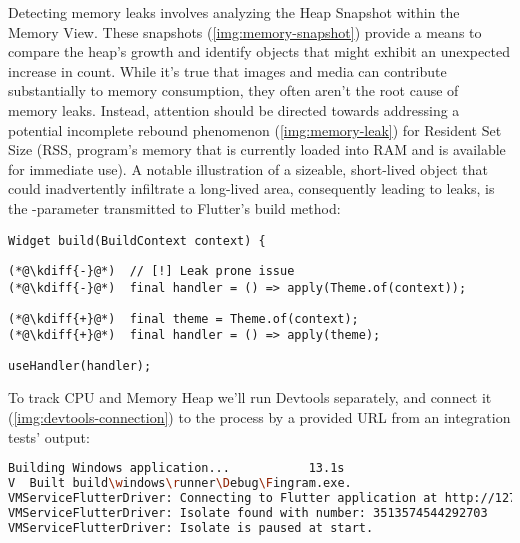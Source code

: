 Detecting memory leaks involves analyzing the Heap Snapshot within the Memory View. These snapshots 
(\cref{img:memory-snapshot}) provide a means to compare the heap's growth and identify objects that might exhibit an 
unexpected increase in count. While it's true that images and media can contribute substantially to memory consumption, 
they often aren't the root cause of memory leaks. Instead, attention should be directed towards addressing a potential 
incomplete rebound phenomenon (\cref{img:memory-leak}) for Resident Set Size (RSS, program's memory that is currently 
loaded into RAM and is available for immediate use). A notable illustration of a sizeable, short-lived object that 
could inadvertently infiltrate a long-lived area, consequently leading to leaks, is the -parameter 
transmitted to Flutter's build method:

\begin{lstlisting}
Widget build(BuildContext context) {
\end{lstlisting}
{
\xpretocmd{\lstlisting}{\vspace{-12pt}}{}{}
\begin{lstlisting}[firstnumber=2, backgroundcolor=\color{backred}]
(*@\kdiff{-}@*)  // [!] Leak prone issue
(*@\kdiff{-}@*)  final handler = () => apply(Theme.of(context));
\end{lstlisting}
\begin{lstlisting}[firstnumber=2, backgroundcolor=\color{backgreen}]
(*@\kdiff{+}@*)  final theme = Theme.of(context);
(*@\kdiff{+}@*)  final handler = () => apply(theme);
\end{lstlisting}
\begin{lstlisting}[firstnumber=4]
   useHandler(handler);
\end{lstlisting}
}


\noindent To track CPU and Memory Heap we'll run Devtools separately, and connect it (\cref{img:devtools-connection}) 
to the process by a provided URL from an integration tests' output:

\begin{lstlisting}[language=bash]
Building Windows application...           13.1s
V  Built build\windows\runner\Debug\Fingram.exe.
VMServiceFlutterDriver: Connecting to Flutter application at http://127.0.0.1:52135/VDm4NX0QVr4=/
VMServiceFlutterDriver: Isolate found with number: 3513574544292703
VMServiceFlutterDriver: Isolate is paused at start.
\end{lstlisting}

